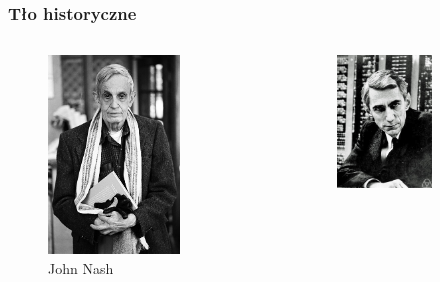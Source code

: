 \documentclass[polish,envcountsect,10pt]{beamer}
\begin{document}
            \begin{frame}
                \frametitle{Tło historyczne}
                \begin{columns}
                        \begin{figure}[H]
                            \centering
                                \includegraphics[width=0.7\textwidth]{images/nash.jpg}
                            \caption{John Nash}
                        \end{figure}
                    \begin{figure}[H]
                        \centering
                            \includegraphics[width=0.7\textwidth]{images/shannon.jpg}

\end{figure}
\end{columns}
\end{frame}
\end{document}
